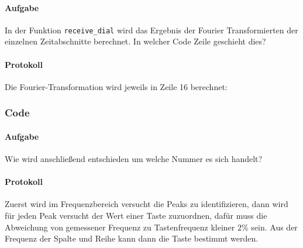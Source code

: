 \documentclass[10pt]{report}
\begin{document}
        \paragraph{Aufgabe}
        In der Funktion \texttt{receive\_dial} wird das Ergebnis der Fourier Transformierten der
        einzelnen Zeitabschnitte berechnet. In welcher Code Zeile geschieht dies?

        \paragraph{Protokoll}
        Die Fourier-Transformation wird jeweils in Zeile 16 berechnet:
        


        \subsubsection{Code}
        \paragraph{Aufgabe}
        Wie wird anschließend entschieden um welche Nummer es sich handelt?

        \paragraph{Protokoll}
        Zuerst wird im Frequenzbereich versucht die Peaks zu identifizieren,
        dann wird für jeden Peak versucht der Wert einer Taste
        zuzuordnen, dafür muss die Abweichung von gemessener Frequenz zu
        \glqq{}Tastenfrequenz\grqq{} kleiner $2\%$ sein. Aus der Frequenz der Spalte
        und Reihe kann dann die Taste bestimmt werden.
        
\end{document}
